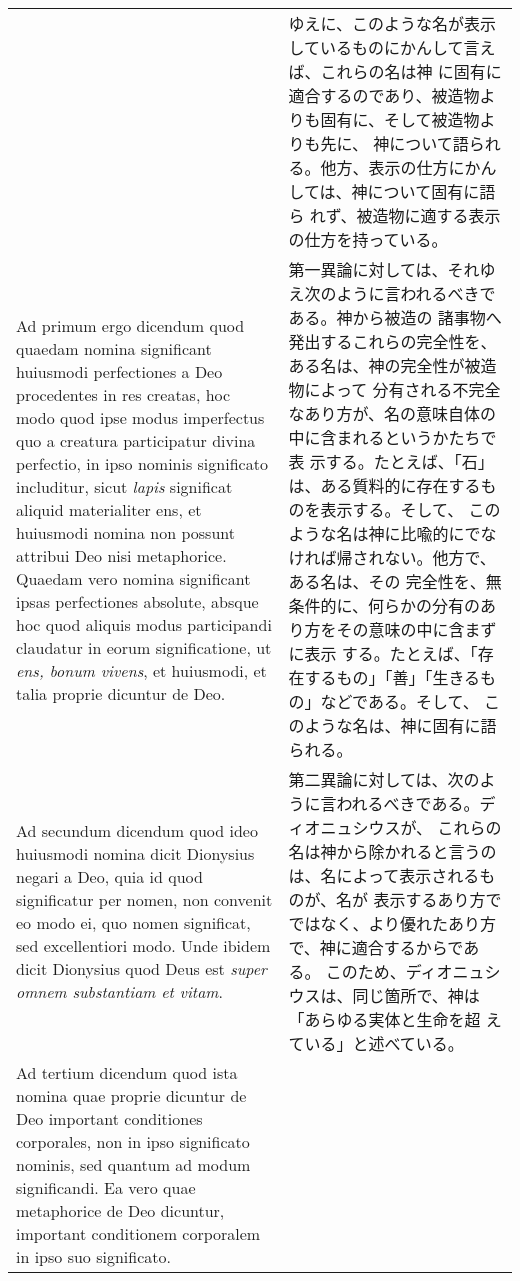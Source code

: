 \documentclass[10pt]{jsarticle}
\begin{document}
\begin{longtable}{p{21em}p{21em}}
&

ゆえに、このような名が表示しているものにかんして言えば、これらの名は神
に固有に適合するのであり、被造物よりも固有に、そして被造物よりも先に、
神について語られる。他方、表示の仕方にかんしては、神について固有に語ら
れず、被造物に適する表示の仕方を持っている。

\\

{\sc Ad primum ergo dicendum} quod quaedam nomina significant
huiusmodi perfectiones a Deo procedentes in res creatas, hoc modo quod
ipse modus imperfectus quo a creatura participatur divina perfectio,
in ipso nominis significato includitur, sicut {\it lapis} significat
aliquid materialiter ens, et huiusmodi nomina non possunt attribui Deo
nisi metaphorice. Quaedam vero nomina significant ipsas perfectiones
absolute, absque hoc quod aliquis modus participandi claudatur in
eorum significatione, ut {\it ens, bonum vivens}, et huiusmodi, et
talia proprie dicuntur de Deo.

&

第一異論に対しては、それゆえ次のように言われるべきである。神から被造の
諸事物へ発出するこれらの完全性を、ある名は、神の完全性が被造物によって
分有される不完全なあり方が、名の意味自体の中に含まれるというかたちで表
示する。たとえば、「石」は、ある質料的に存在するものを表示する。そして、
このような名は神に比喩的にでなければ帰されない。他方で、ある名は、その
完全性を、無条件的に、何らかの分有のあり方をその意味の中に含まずに表示
する。たとえば、「存在するもの」「善」「生きるもの」などである。そして、
このような名は、神に固有に語られる。

\\

{\sc Ad secundum dicendum} quod ideo huiusmodi nomina dicit Dionysius
negari a Deo, quia id quod significatur per nomen, non convenit eo
modo ei, quo nomen significat, sed excellentiori modo. Unde ibidem
dicit Dionysius quod Deus est {\it super omnem substantiam et vitam}.

&

第二異論に対しては、次のように言われるべきである。ディオニュシウスが、
これらの名は神から除かれると言うのは、名によって表示されるものが、名が
表示するあり方でではなく、より優れたあり方で、神に適合するからである。
このため、ディオニュシウスは、同じ箇所で、神は「あらゆる実体と生命を超
えている」と述べている。

\\

{\sc Ad tertium dicendum} quod ista nomina quae proprie dicuntur de
Deo important conditiones corporales, non in ipso significato nominis,
sed quantum ad modum significandi. Ea vero quae metaphorice de Deo
dicuntur, important conditionem corporalem in ipso suo significato.


\end{longtable}
\end{document}

